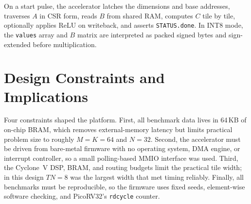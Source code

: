 On a start pulse, the accelerator latches the dimensions and base
addresses, traverses $A$ in CSR form, reads $B$ from shared RAM, computes
$C$ tile by tile, optionally applies ReLU on writeback, and asserts
\texttt{STATUS.done}. In INT8 mode, the \texttt{values} array and $B$
matrix are interpreted as packed signed bytes and sign-extended before
multiplication.

\section{Design Constraints and Implications}

Four constraints shaped the platform. First, all benchmark data lives in
64\,KB of on-chip BRAM, which removes external-memory latency but limits
practical problem size to roughly $M = K = 64$ and $N = 32$. Second, the
accelerator must be driven from bare-metal firmware with no operating
system, DMA engine, or interrupt controller, so a small polling-based
MMIO interface was used. Third, the Cyclone~V DSP, BRAM, and routing
budgets limit the practical tile width; in this design $TN = 8$ was the
largest width that met timing reliably. Finally, all benchmarks must be
reproducible, so the firmware uses fixed seeds, element-wise software
checking, and PicoRV32's \texttt{rdcycle} counter.
